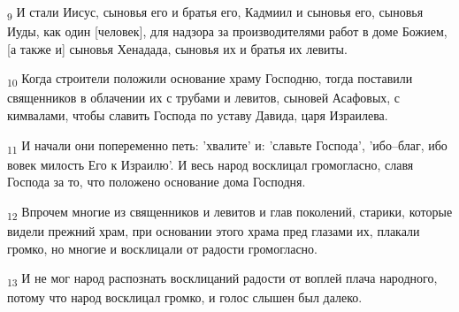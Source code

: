 \begin{tcolorbox}
\textsubscript{9} И стали Иисус, сыновья его и братья его, Кадмиил и сыновья его, сыновья Иуды, как один [человек], для надзора за производителями работ в доме Божием, [а также и] сыновья Хенадада, сыновья их и братья их левиты.
\end{tcolorbox}
\begin{tcolorbox}
\textsubscript{10} Когда строители положили основание храму Господню, тогда поставили священников в облачении их с трубами и левитов, сыновей Асафовых, с кимвалами, чтобы славить Господа по уставу Давида, царя Израилева.
\end{tcolorbox}
\begin{tcolorbox}
\textsubscript{11} И начали они попеременно петь: 'хвалите' и: 'славьте Господа', 'ибо--благ, ибо вовек милость Его к Израилю'. И весь народ восклицал громогласно, славя Господа за то, что положено основание дома Господня.
\end{tcolorbox}
\begin{tcolorbox}
\textsubscript{12} Впрочем многие из священников и левитов и глав поколений, старики, которые видели прежний храм, при основании этого храма пред глазами их, плакали громко, но многие и восклицали от радости громогласно.
\end{tcolorbox}
\begin{tcolorbox}
\textsubscript{13} И не мог народ распознать восклицаний радости от воплей плача народного, потому что народ восклицал громко, и голос слышен был далеко.
\end{tcolorbox}
